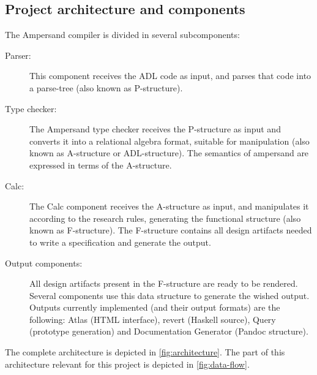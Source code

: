 \subsection{Project architecture and components}
\label{subsec:architecture}
The Ampersand compiler is divided in several subcomponents:
%
%
%
%
\begin{description}
	\item[Parser:] This component receives the ADL code as input, and parses that code into a parse-tree (also known as P-structure).
	\item[Type checker:] The Ampersand type checker receives the P-structure as input and converts it into a relational algebra format, suitable for manipulation (also known as A-structure or ADL-structure).
		 The semantics of ampersand are expressed in terms of the A-structure.
	\item[Calc:] The Calc component receives the A-structure as input, and manipulates it according to the research rules, generating the functional structure (also known as F-structure).
		The F-structure contains all design artifacts needed to write a specification and generate the output.
	\item[Output components:] All design artifacts present in the F-structure are ready to be rendered.
		Several components use this data structure to generate the wished output.
		Outputs currently implemented (and their output formats) are the following: Atlas (HTML interface), revert (Haskell source), Query (prototype generation) and Documentation Generator (Pandoc structure).
\end{description}
%
The complete architecture is depicted in \autoref{fig:architecture}.
The part of this architecture relevant for this project is depicted in \autoref{fig:data-flow}.
%
